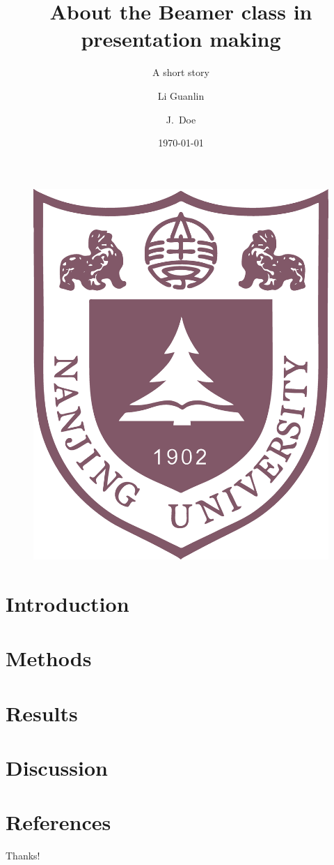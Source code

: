 \documentclass{beamer}
\title[About Beamer]
{About the Beamer class in presentation making}
\subtitle{A short story}
\author[Eric] %
{Li Guanlin\inst{1} \and J.~Doe\inst{1}}
\institute[NJU] %
{
\inst{1}%
Undergraduates of ICS\\
Nanjing University
\and
}
\date[NJU 2023] %
{\today}
\begin{document}
\begin{frame}
    \titlepage
    \begin{figure}[htpb]
        \begin{center}
            \includegraphics[width=0.2\linewidth]{pic/NJU_Logo.eps}
        \end{center}
    \end{figure}
\end{frame}

\begin{frame}
    \tableofcontents[sectionstyle=show,subsectionstyle=show/shaded/hide,subsubsectionstyle=show/shaded/hide]
\end{frame}

\section{Introduction}


\section{Methods}


\section{Results}


\section{Discussion}


\section{References}

\begin{frame}[allowframebreaks]
    
    
\end{frame}

\begin{frame}
    \begin{center}
        {\Huge\calligra Thanks!}\cite{origin}
    \end{center}
\end{frame}
\end{document}
